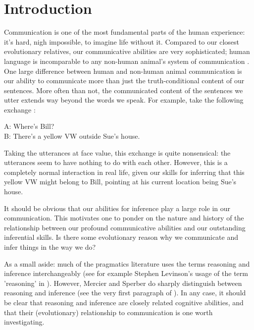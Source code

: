 \chapter*{Introduction}
\label{ch:introduction}


Communication is one of the most fundamental parts of the human experience: it's hard, nigh impossible, to imagine life without it. Compared to our closest evolutionary relatives, our communicative abilities are very sophisticated; human language is incomparable to any non-human animal's system of communication \citep{CheneySeyfarth98}.
One large difference between human and non-human animal communication is our ability to communicate more than just the truth-conditional content of our sentences. More often than not, the communicated content of the sentences we utter extends way beyond the words we speak. For example, take the following exchange \citep[p.~102]{Levinson83}:
\begin{quoting}
    A: Where's Bill? \\
    B: There's a yellow VW outside Sue's house.
\end{quoting}
Taking the utterances at face value, this exchange is quite nonsensical: the utterances seem to have nothing to do with each other. However, this is a completely normal interaction in real life, given our skills for inferring that this yellow VW might belong to Bill, pointing at his current location being Sue's house.

It should be obvious that our abilities for inference play a large role in our communication. This motivates one to ponder on the nature and history of the relationship between our profound communicative abilities and our outstanding inferential skills. Is there some evolutionary reason why we communicate and infer things in the way we do?


As a small aside: much of the pragmatics literature uses the terms reasoning and inference interchangeably (see for example Stephen Levinson's usage of the term 'reasoning' in \citet[p.~218]{Levinson83}). However, Mercier and Sperber do sharply distinguish between reasoning and inference (see the very first paragraph of \citet{MS11}).
In any case, it should be clear that reasoning and inference are closely related cognitive abilities, and that their (evolutionary) relationship to communication is one worth investigating.

